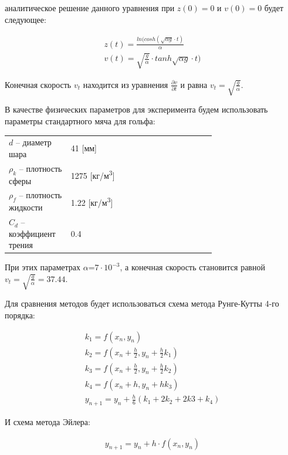 \documentclass[master, och, diploma, times]{sty/SCWorks}
\theoremstyle{plain}
\theoremstyle{definition}
\begin{document}
\noindent аналитическое решение данного уравнения при $z(0)=0$ и $v(0)=0$ будет следующее:

\begin{equation}
\begin{aligned}
z(t)=\frac{ln(cosh(\sqrt{\alpha g} \cdot t)}{\alpha} \\
v(t)=\sqrt{\frac{g}{\alpha}} \cdot tanh{\sqrt{\alpha g} \cdot t)}
\end{aligned}
\end{equation}

Конечная скорость $v_t$ находится из уравнения $\frac{\partial v}{ \partial t}$ и равна $v_t=\sqrt{\frac{g}{\alpha}}$.

В качестве физических параметров для эксперимента будем использовать параметры стандартного мяча для гольфа:

\begin{threeparttable}
\begin{longtable}[H]{lp{0.7\linewidth}}
{$d$} -- диаметр шара & 41 [мм] \\
{$\rho_k$} -- плотность сферы & 1275 [кг/м\textsuperscript{3}] \\
{$\rho_f$} -- плотность жидкости & 1.22 [кг/м\textsuperscript{3}] \\
{$C_d$} -- коэффициент трения & 0.4 
\end{longtable} 
\end{threeparttable}


При этих параметрах $\alpha$=$7 \cdot 10^{-3}$, а конечная скорость становится равной $v_t=\sqrt{\frac{g}{\alpha}}=37.44$.


Для сравнения методов будет использоваться схема метода Рунге-Кутты 4-го порядка:

\begin{equation}%
\begin{aligned}
k_1 = f(x_n, y_n) \\
k_2 = f(x_n+\frac{h}{2}, y_n+\frac{h}{2}k_1) \\
k_3 = f(x_n+\frac{h}{2}, y_n+\frac{h}{2}k_2) \\ 
k_4 = f(x_n+h, y_n+hk_3) \\
y_{n+1}=y_n+\frac{h}{6}(k_1+2k_2+2k3+k_4)
\end{aligned}
\end{equation}


\noindent И схема метода Эйлера:

\begin{equation}%
\begin{aligned}
y_{n+1}=y_n+h \cdot f(x_n, y_n)
\end{aligned}
\end{equation}
\end{document}
